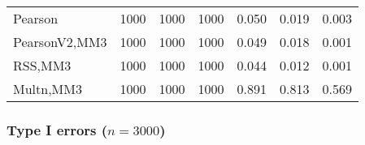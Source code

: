 \documentclass[
]{article}
\begin{document}
\begin{table}[H]
{\begin{tabular}[t]{lrrrrrr}
\hspace{1em}Pearson & 1000 & 1000 & 1000 & 0.050 & 0.019 & 0.003\\
\hspace{1em}PearsonV2,MM3 & 1000 & 1000 & 1000 & 0.049 & 0.018 & 0.001\\
\hspace{1em}RSS,MM3 & 1000 & 1000 & 1000 & 0.044 & 0.012 & 0.001\\
\hspace{1em}Multn,MM3 & 1000 & 1000 & 1000 & 0.891 & 0.813 & 0.569\\
\bottomrule
\end{tabular}}
\end{table}

\hypertarget{type-i-errors-n3000-2}{%
\subsubsection{\texorpdfstring{Type I errors
(\(n=3000\))}{Type I errors (n=3000)}}\label{type-i-errors-n3000-2}}
\end{document}
